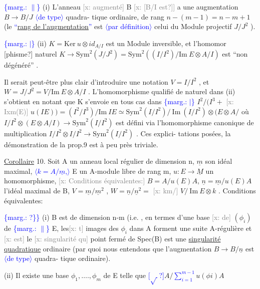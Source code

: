 \documentclass[11pt]{article}
\newcommand{\scanpage}[1]{\par\bigskip\noindent{\small\sffamily[scan #1]}\par}
\newcommand{\mspage}[1]{{\small\sffamily[p.\,#1]}}
\newcommand{\hand}[1]{\textcolor{blue}{#1}}
\newcommand{\inserted}[2][]{\textcolor{blue}{$\langle$#2$\rangle$}}
\newcommand{\margin}[1]{\textcolor{blue}{\{\textsf{marg.:} #1\}}}
\newcommand{\xout}[1]{\textcolor{gray}{[\textsf{x:} #1]}}
\newcommand{\uline}[1]{\underline{#1}}
\newcommand{\uuline}[1]{\underline{\underline{#1}}}
\newcommand{\unsure}[1]{[#1?]}
\begin{document}
\margin{$\|$} (i) L'anneau \xout{augmenté} B \xout{\unsure{B/I est}} a une augmentation $B\to B/J$ \inserted{de type} quadra-%
tique ordinaire, de rang $n-(m-1)= n-m+1$ (le \hand{``}\uuline{rang de l'augmentation}\hand{''}
est \inserted{par définition} celui du Module projectif $J/J^2$ ).

\margin{$|$} (ii) $K = \mathrm{Ker}\ u\otimes id_{A/I}$ est un Module inversible, et l'homomor
\unsure{phisme} naturel $K \longrightarrow \mathrm{Sym}^2(J/J^2) = \mathrm{Sym}^2( (I/I^2)/\mathrm{Im}\ E\otimes A/I )$ est
``non dégénéré'' .

Il serait peut-être plus clair d'introduire une notation $V = I/I^2$ ,
et $W = J/J^2 = V / \mathrm{Im}\ E\otimes A/I$ . L'homomorphisme qualifié de naturel
dans (ii) s'obtient en notant que K s'envoie en tous cas dans
\margin{$|$} $I^2/(I^3 +$ \xout{Ixm(E)} $u(IE)) = (I^2/I^3)/\mathrm{Im}\ IE \simeq \mathrm{Sym}^2(I/I^2)/\ \mathrm{Im}\ (I/I^2)\otimes(E\otimes A/$
où $I/I^2 \otimes(E \otimes A/I) \to \mathrm{Sym}^2(I/I^2)$ est défini via l'homomorphisme
canonique de multiplication $I/I^2 \otimes I/I^2 \to \mathrm{Sym}^2(I/I^2 )$ . Ces explici-%
tations posées, la démonstration de la prop.9 est à peu près triviale.

\uline{Corollaire} 10. Soit A un anneau local régulier de dimension n, $\underline{m}$ son
idéal maximal, \inserted[typed]{$k=A/\underline{m}$,} E un A-module libre de rang m, $u{:}E \to \underline{M}$ un homomorphisme,
\xout{Conditions équivalentes:} $B = A/u(E)A$, $\underline{n} = \underline{m}/u(E)A$ l'idéal maximal de B,
$V = \underline{m}/\underline{m}^2$ , $W = \underline{n}/\underline{n}^2 =$ \xout{km/} $V/\ \mathrm{Im}\ E\otimes k$ . Conditions équivalentes:

\margin{?\}} (i) B est de dimension n-m (i.e. , en termes d'une base \xout{de} $(\phi_i)$ de
\margin{$\|$} E, les\xout{t} images des $\phi_i$ dans A forment une suite A-régulière et \xout{est} le
\xout{singularité qu} point fermé de Spec(B) est une \uline{singularité quadratique}
ordinaire (par quoi nous entendons que l'augmentation $B\to B/\underline{n}$ est \inserted{de type} quadra-%
tique ordinaire).

(ii) Il existe une base $\phi_1 ,\ldots., \phi_m$ de E telle que \hand{\unsure{$\sqrt{\ }$}}$A/$\hand{$\sum_{i=1}^{m-1}$}$u(\phi i)A$

\mspage{151}

\clearpage
\scanpage{25/152}
\mspage{13}
\end{document}
